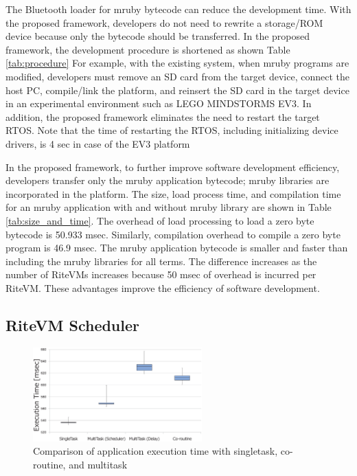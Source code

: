 \documentclass[S,R,E]{article/compsoft}
\begin{document}
The Bluetooth loader for mruby bytecode can reduce the development time.
With the proposed framework, developers do not need to rewrite a storage/ROM device because only the bytecode should be transferred.
In the proposed framework, the development procedure is shortened as shown Table \ref{tab:procedure}
For example, with the existing system, when mruby programs are modified, developers must remove an SD card from the target device, connect the host PC, compile/link the platform, and reinsert the SD card in the target device in an experimental environment such as LEGO MINDSTORMS EV3.
In addition, the proposed framework eliminates the need to restart the target RTOS.
Note that the time of restarting the RTOS, including initializing device drivers, is 4 sec in case of the EV3 platform \cite{par:EV3}

In the proposed framework, to further improve software development efficiency, developers transfer only the mruby application bytecode; mruby libraries are incorporated in the platform.
The size, load process time, and compilation time for an mruby application with and without mruby library are shown in Table \ref{tab:size_and_time}.
The overhead of load processing to load a zero byte bytecode is 50.933 msec.
Similarly, compilation overhead to compile a zero byte program is 46.9 msec.
The mruby application bytecode is smaller and faster than including the mruby libraries for all terms.
The difference increases as the number of RiteVMs increases because 50 msec of overhead is incurred per RiteVM. 
These advantages improve the efficiency of software development.


\subsection{RiteVM Scheduler}

\begin{figure}[t]
    \centering
    \includegraphics[width=6.5cm,clip]{figure/comparison_s_c_m.eps}
\caption{Comparison of application execution time with singletask, co-routine, and multitask}
\label{fig:comparison_s_c_m}
\end{figure}
\end{document}
